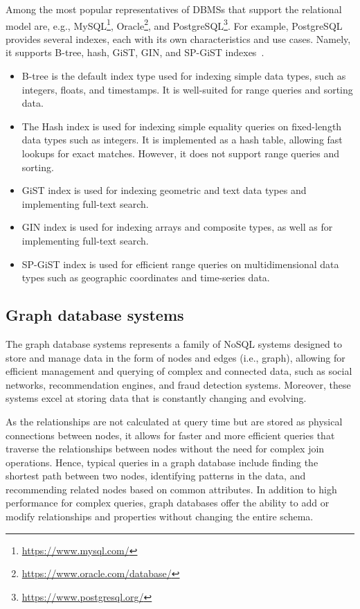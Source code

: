 Among the most popular representatives of DBMSs that support the relational model are, e.g., MySQL\footnote{\url{https://www.mysql.com/}}, Oracle\footnote{\url{https://www.oracle.com/database/}}, and PostgreSQL\footnote{\url{https://www.postgresql.org/}}. For example, PostgreSQL provides several indexes, each with its own characteristics and use cases. Namely, it supports B-tree, hash, GiST, GIN, and SP-GiST indexes~\citep{postgresqlIndexTypes}.
\begin{itemize}
    \item B-tree is the default index type used for indexing simple data types, such as integers, floats, and timestamps. It is well-suited for range queries and sorting data.
    \item The Hash index is used for indexing simple equality queries on fixed-length data types such as integers. It is implemented as a hash table, allowing fast lookups for exact matches. However, it does not support range queries and sorting.
    \item GiST index is used for indexing geometric and text data types and implementing full-text search.
    \item GIN index is used for indexing arrays and composite types, as well as for implementing full-text search.
    \item SP-GiST index is used for efficient range queries on multidimensional data types such as geographic coordinates and time-series data.
\end{itemize}

\subsection{Graph database systems}
The graph database systems represents a family of NoSQL systems designed to store and manage data in the form of nodes and edges (i.e., graph), allowing for efficient management and querying of complex and connected data,  such as social networks, recommendation engines, and fraud detection systems.
Moreover, these systems excel at storing data that is constantly changing and evolving. 

As the relationships are not calculated at query time but are stored as physical connections between nodes, it allows for faster and more efficient queries that traverse the relationships between nodes without the need for complex join operations. Hence, typical queries in a graph database include finding the shortest path between two nodes, identifying patterns in the data, and recommending related nodes based on common attributes. In addition to high performance for complex queries, graph databases offer the ability to add or modify relationships and properties without changing the entire schema.

